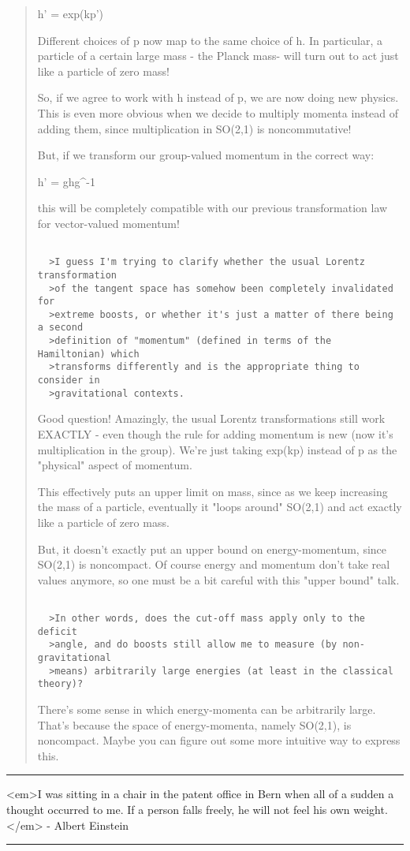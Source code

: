 \begin{quote}
  h' = exp(kp')

  Different choices of p now map to the same choice of h.
  In particular, a particle of a certain large mass - the 
  Planck mass- will turn out to act just like a particle 
  of zero mass!   

  So, if we agree to work with h instead of p, we are now 
  doing new physics.  This is even more obvious when we decide
  to multiply momenta instead of adding them, since multiplication
  in SO(2,1) is noncommutative!

  But, if we transform our group-valued momentum in the correct
  way:

  h' = ghg^{-1}

  this will be completely compatible with our previous transformation
  law for vector-valued momentum!


\begin{verbatim}

  >I guess I'm trying to clarify whether the usual Lorentz transformation
  >of the tangent space has somehow been completely invalidated for
  >extreme boosts, or whether it's just a matter of there being a second
  >definition of "momentum" (defined in terms of the Hamiltonian) which
  >transforms differently and is the appropriate thing to consider in
  >gravitational contexts.
\end{verbatim}
    
  Good question!  Amazingly, the usual Lorentz transformations still 
  work EXACTLY - even though the rule for adding momentum is new (now 
  it's multiplication in the group).  We're just taking exp(kp) instead 
  of p as the "physical" aspect of momentum.  

  This effectively puts an upper limit on mass, since as
  we keep increasing the mass of a particle, eventually it "loops 
  around" SO(2,1) and act exactly like a particle of zero mass.  

  But, it doesn't exactly put an upper bound on energy-momentum, 
  since SO(2,1) is noncompact.  Of course energy and momentum don't
  take real values anymore, so one must be a bit careful with this
  "upper bound" talk.


\begin{verbatim}

  >In other words, does the cut-off mass apply only to the deficit 
  >angle, and do boosts still allow me to measure (by non-gravitational 
  >means) arbitrarily large energies (at least in the classical theory)?
\end{verbatim}
    

  There's some sense in which energy-momenta can be arbitrarily 
  large.  That's because the space of energy-momenta, namely SO(2,1), 
  is noncompact.  Maybe you can figure out some more intuitive way 
  to express this.
\end{quote}

\par\noindent\rule{\textwidth}{0.4pt}
<em>I was sitting in a chair in the patent office in Bern when all of a
sudden a thought occurred to me.  If a person falls freely, he will
not feel his own weight.</em> - Albert Einstein

\par\noindent\rule{\textwidth}{0.4pt}
